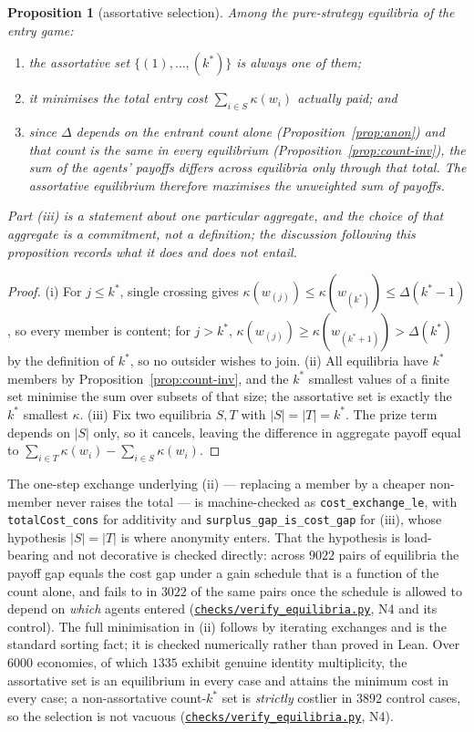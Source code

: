 \documentclass[11pt]{article}
\newtheorem{proposition}{Proposition}
\newcommand{\file}[1]{\href{run:#1}{\texttt{#1}}}
\begin{document}
\begin{proposition}[assortative selection]
\label{prop:assort}
Among the pure-strategy equilibria of the entry game:
\begin{enumerate}
\item the assortative set $\{(1),\dots,(k^*)\}$ is always one of them;
\item it minimises the total entry cost $\sum_{i\in S}\kappa(w_i)$ actually
  paid; and
\item since $\Delta$ depends on the entrant count alone
  (Proposition~\ref{prop:anon}) and that count is the same in every
  equilibrium (Proposition~\ref{prop:count-inv}), the sum of the agents'
  payoffs differs across equilibria \emph{only} through that total. The
  assortative equilibrium therefore maximises the unweighted sum of payoffs.
\end{enumerate}
Part (iii) is a statement about one particular aggregate, and the choice of
that aggregate is a commitment, not a definition; the discussion following
this proposition records what it does and does not entail.
\end{proposition}

\begin{proof}
(i) For $j\le k^*$, single crossing gives $\kappa(w_{(j)})\le
\kappa(w_{(k^*)})\le\Delta(k^*-1)$, so every member is content; for $j>k^*$,
$\kappa(w_{(j)})\ge\kappa(w_{(k^*+1)})>\Delta(k^*)$ by the definition of
$k^*$, so no outsider wishes to join. (ii) All equilibria have $k^*$ members
by Proposition~\ref{prop:count-inv}, and the $k^*$ smallest values of a
finite set minimise the sum over subsets of that size; the assortative set is
exactly the $k^*$ smallest $\kappa$. (iii) Fix two equilibria $S,T$ with
$|S|=|T|=k^*$. The prize term depends on $|S|$ only, so it cancels, leaving
the difference in aggregate payoff equal to
$\sum_{i\in T}\kappa(w_i)-\sum_{i\in S}\kappa(w_i)$.
\end{proof}

The one-step exchange underlying (ii) --- replacing a member by a cheaper
non-member never raises the total --- is machine-checked as
\texttt{cost\_exchange\_le}, with \texttt{totalCost\_cons} for additivity and
\texttt{surplus\_gap\_is\_cost\_gap} for (iii), whose hypothesis
$|S|=|T|$ is where anonymity enters. That the hypothesis is load-bearing and
not decorative is checked directly: across $9022$ pairs of equilibria the
payoff gap equals the cost gap under a gain schedule that is a function of
the count alone, and fails to in $3022$ of the same pairs once the schedule
is allowed to depend on \emph{which} agents entered
(\file{checks/verify\_equilibria.py}, N4 and its control). The full
minimisation in (ii)
follows by iterating exchanges and is the standard sorting fact; it is checked
numerically rather than proved in Lean. Over $6000$ economies, of which
$1335$ exhibit genuine identity multiplicity, the assortative set is an
equilibrium in every case and attains the minimum cost in every case; a
non-assortative count-$k^*$ set is \emph{strictly} costlier in $3892$ control
cases, so the selection is not vacuous
(\file{checks/verify\_equilibria.py}, N4).
\end{document}
